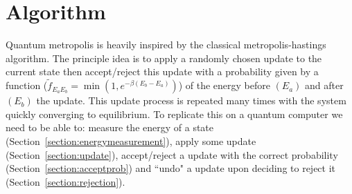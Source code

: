 \documentclass[aps,floatfix,10pt,amssymb,amsfont,amsmath,superscriptaddress,float,nofootinbib,longbibliography,nobalancelastpage,twocolumn]{revtex4-2}
\begin{document}



\section{Algorithm}
\label{section:algorithm}
Quantum metropolis is heavily inspired by the classical metropolis-hastings algorithm. The principle idea is to apply a randomly chosen update to the current state then accept/reject this update with a probability given by a function ($\tilde{f}_{E_aE_b}=\min(1, e^{-\beta(E_b-E_a)})$) of the energy before $(E_a)$ and after $(E_b)$ the update. This update process is repeated many times with the system quickly converging to equilibrium. To replicate this on a quantum computer we need to be able to: measure the energy of a state (Section~\ref{section:energymeasurement}), apply some update (Section~\ref{section:update}), accept/reject a update with the correct probability (Section~\ref{section:acceptprob}) and ``undo" a update upon deciding to reject it (Section~\ref{section:rejection}).
\end{document}

